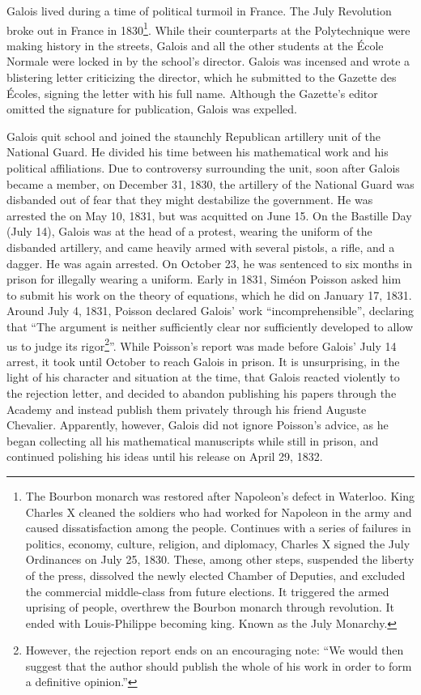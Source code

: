 \documentclass{article}
\begin{document}
Galois lived during a time of political turmoil in France. The July Revolution broke out in France in 1830\footnote{The Bourbon monarch was restored after Napoleon's defect in Waterloo. King Charles X cleaned the soldiers who had worked for Napoleon in the army and caused dissatisfaction among the people. Continues with a series of failures in politics, economy, culture, religion, and diplomacy, Charles X signed the July Ordinances on July 25, 1830. These, among other steps, suspended the liberty of the press, dissolved the newly elected Chamber of Deputies, and excluded the commercial middle-class from future elections. It triggered the armed uprising of people, overthrew the Bourbon monarch through revolution. It ended with Louis-Philippe becoming king. Known as the July Monarchy.}. While their counterparts at the Polytechnique were making history in the streets, Galois and all the other students at the École Normale were locked in by the school's director. Galois was incensed and wrote a blistering letter criticizing the director, which he submitted to the Gazette des Écoles, signing the letter with his full name. Although the Gazette's editor omitted the signature for publication, Galois was expelled.

Galois quit school and joined the staunchly Republican artillery unit of the National Guard. He divided his time between his mathematical work and his political affiliations. Due to controversy surrounding the unit, soon after Galois became a member, on December 31, 1830, the artillery of the National Guard was disbanded out of fear that they might destabilize the government. He was arrested the on May 10, 1831, but was acquitted on June 15. On the Bastille Day (July 14), Galois was at the head of a protest, wearing the uniform of the disbanded artillery, and came heavily armed with several pistols, a rifle, and a dagger. He was again arrested. On October 23, he was sentenced to six months in prison for illegally wearing a uniform. Early in 1831, Siméon Poisson asked him to submit his work on the theory of equations, which he did on January 17, 1831. Around July 4, 1831, Poisson declared Galois' work ``incomprehensible'', declaring that ``The argument is neither sufficiently clear nor sufficiently developed to allow us to judge its rigor\footnote{However, the rejection report ends on an encouraging note: ``We would then suggest that the author should publish the whole of his work in order to form a definitive opinion.''\cite{Wiki-Galois}}''. While Poisson's report was made before Galois' July 14 arrest, it took until October to reach Galois in prison. It is unsurprising, in the light of his character and situation at the time, that Galois reacted violently to the rejection letter, and decided to abandon publishing his papers through the Academy and instead publish them privately through his friend Auguste Chevalier. Apparently, however, Galois did not ignore Poisson's advice, as he began collecting all his mathematical manuscripts while still in prison, and continued polishing his ideas until his release on April 29, 1832.
\end{document}
